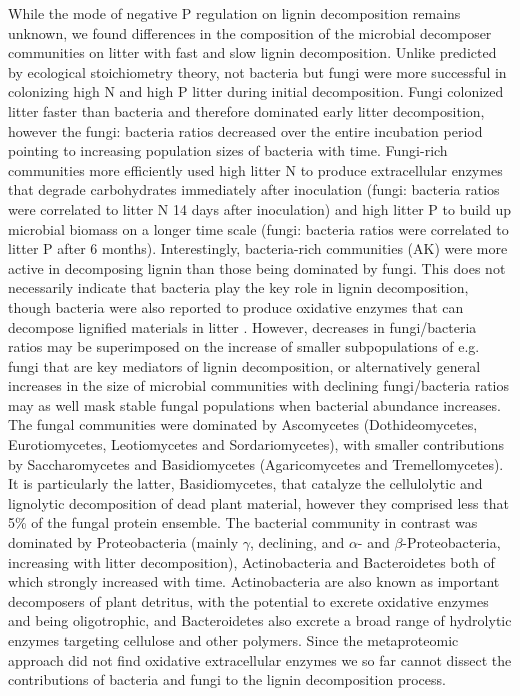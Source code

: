 While the mode of negative P regulation on lignin decomposition remains unknown, we found differences in the composition of the microbial decomposer communities on litter with fast and slow lignin decomposition. Unlike predicted by ecological stoichiometry theory, not bacteria but fungi were more successful in colonizing high N and high P litter during initial decomposition. Fungi colonized litter faster than bacteria and therefore dominated early litter decomposition, however the fungi: bacteria ratios decreased over the entire incubation period pointing to increasing population sizes of bacteria with time. Fungi-rich communities more efficiently used high litter N to produce extracellular enzymes that degrade carbohydrates immediately after inoculation (fungi: bacteria ratios were correlated to litter N 14 days after inoculation) and high litter P to build up microbial biomass on a longer time scale (fungi: bacteria ratios were correlated to litter P after 6 months). Interestingly, bacteria-rich communities (AK) were more active in decomposing lignin than those being dominated by fungi. This does not necessarily indicate that bacteria play the key role in lignin decomposition, though bacteria were also reported to produce oxidative enzymes that can decompose lignified materials in litter \cite{Bugg2011}. However, decreases in fungi/bacteria ratios may be superimposed on the increase of smaller subpopulations of e.g. fungi that are key mediators of lignin decomposition, or alternatively general increases in the size of microbial communities with declining fungi/bacteria ratios may as well mask stable fungal populations when  bacterial abundance increases. The fungal communities were dominated by Ascomycetes (Dothideomycetes, Eurotiomycetes, Leotiomycetes and Sordariomycetes), with smaller contributions by Saccharomycetes and Basidiomycetes (Agaricomycetes and Tremellomycetes). It is particularly the latter, Basidiomycetes, that catalyze the cellulolytic and lignolytic decomposition of dead plant material, however they comprised less that 5\% of the fungal protein ensemble. The bacterial community in contrast was dominated by Proteobacteria (mainly $\gamma$, declining, and $\alpha$- and $\beta$-Proteobacteria, increasing with litter decomposition), Actinobacteria and Bacteroidetes both of which strongly increased with time. Actinobacteria are also known as important decomposers of plant detritus, with the potential to excrete oxidative enzymes and being oligotrophic, and Bacteroidetes also excrete a broad range of hydrolytic enzymes targeting cellulose and other polymers. Since the metaproteomic approach did not find oxidative extracellular enzymes we so far cannot dissect the contributions of bacteria and fungi to the lignin decomposition process. 

